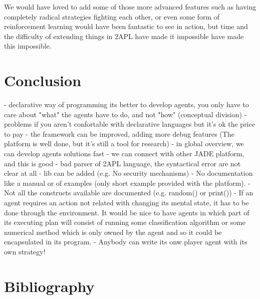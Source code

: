\documentclass[a4paper]{article}
\begin{document}
We would have loved to add some of those more advanced features such as having completely radical strategies fighting each other, or even some form of reinforcement learning would have been fantastic to see in action, but time and the difficulty of extending things in 2APL have made it impossible have made this impossible.


\section{Conclusion}\label{sec:concl} 

- declarative way of programming its better to develop agents, you only have to care about "what" the agents have to do, and not "how" (conceptual division)
- problems if you aren't confortable with declarative languages but it's ok the price to pay
- the framework can be improved, adding more debug features (The platform is well done, but it's still a tool for research)
- in global overview, we can develop agents solutions fast
- we can connect with other JADE platform, and this is good
- bad parser of 2APL language, the syntactical error are not clear at all
- lib can be added (e.g. No security mechanisms)
- No documentation like a manual or of examples (only short example provided with the platform). 
- Not all the constructs available are documented (e.g. random() or print())
- If an agent requires an action not related with changing its mental state, it has to be done through the environment. It would be nice to have agents in which part of its executing plan will consist of running some classification algorithm or some numerical method which is only owned by the agent and so it could be encapsulated in its program.
- Anybody can write its onw player agent with its own strategy!

\section{Bibliography}
\nocite{*}


\end{document}
